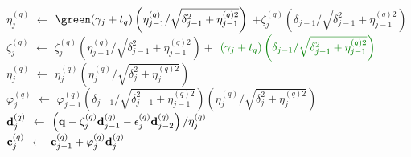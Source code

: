 \begin{algorithm2e}[t!]
{{        \\
        $\eta_j^{(q)}$ $\gets$ $\green (\gamma_j + t_q) \left( \eta_{j-1}^{(q)} / \sqrt{\delta_{j-1}^2 + \eta_{j-1}^{(q)2}} \right)$ $+ \zeta_j^{(q)} \left( \delta_{j-1} / \sqrt{\delta_{j-1}^2 + \eta_{j-1}^{(q)2}} \right)$%
        \\
        $\zeta_j^{(q)}$ $\gets$ $\zeta_j^{(q)} \left( \eta_{j-1}^{(q)} / \sqrt{\delta_{j-1}^2 + \eta_{j-1}^{(q)2}} \right) + $ $\color{green} (\gamma_j + t_q) \left( \delta_{j-1} / \sqrt{\delta_{j-1}^2 + \eta_{j-1}^{(q)2}} \right)$
        \\
        $\eta_j^{(q)}$ $\gets$ $\eta_j^{(q)} \left( \eta_j^{(q)} / \sqrt{\delta_j^2 + \eta_j^{(q)2}} \right)$
        \\
        $\varphi_{j}^{(q)}$ $\gets$ $\varphi_{j-1}^{(q)} \left( \delta_{j-1} / \sqrt{\delta_{j-1}^2 + \eta_{j-1}^{(q)2}} \right) \left( \eta_j^{(q)} / \sqrt{\delta_j^2 + \eta_j^{(q)2}} \right) $
        \\
        $\mathbf{d}_j^{(q)}$ $\gets$ $\left( \mathbf{q} - \zeta_j^{(q)} \mathbf{d}_{j-1}^{(q)} - \epsilon_j^{(q)} \mathbf{d}_{j-2}^{(q)} \right) / \eta_j^{(q)}$
        \\
        $\mathbf{c}_j^{(q)}$ $\gets$ $\mathbf{c}_{j-1}^{(q)} + \varphi_{j}^{(q)} \mathbf{d}_j^{(q)}$
      }
    }
\end{algorithm2e}
